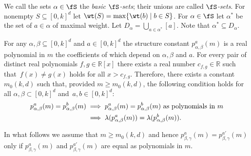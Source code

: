 We call the sets $\alpha \in \fS$ the \emph{basic $\fS$-sets};
their unions are called \emph{$\fS$-sets}.
For nonempty $S \subseteq [0,k]^d$ let $\wt(S) = \max\{\wt(b) \mid b \in S\}$.
For $\alpha \in \fS$ let $\alpha^*$ be the set of $a \in \alpha$ of maximal weight.
Let $D_\alpha = \bigcup_{a \in \alpha^*} [a]$. Note that $\alpha^*\subseteq D_\alpha$.


{For any $\alpha,\beta\subseteq [0,k]^d$ and $a\in [0,k]^d$ the structure constant $p_{\alpha,\beta}^a(m)$ is a real polynomial in $m$ the coefficients of which depend on $\alpha,\beta$ and $a$. For every pair of distinct real polynomials $f,g\in \mathbb{R}[x]$ there exists a real number $c_{f,g}\in\mathbb{R}$ such that~$f(x)\neq g(x)$ holds for all $x > c_{f,g}$. Therefore, there exists a constant $m_0(k,d)$ such that, provided $m \geq m_0(k, d)$, the following condition holds for all $\alpha,\beta\subset [0,k]^d$ and~$a,b\in [0,k]^d$:
\begin{align}\label{poly}
    p_{\alpha,\beta}^a(m) = p_{\alpha,\beta}^b(m)
    &\implies p_{\alpha,\beta}^a(m) = p_{\alpha,\beta}^b(m)\text{ as polynomials in } m \\
    \notag &\implies \lambda(p_{\alpha,\beta}^a(m)) = \lambda(p_{\alpha,\beta}^b(m)).
\end{align}}

{In what follows we assume that $m \geq m_0(k, d)$ and hence $p^a_{\beta,\gamma}(m) = p^{a'}_{\beta,\gamma}(m)$ only if $p^a_{\beta,\gamma}(m)$ and $p^{a'}_{\beta,\gamma}(m)$ are equal as polynomials in $m$.}

